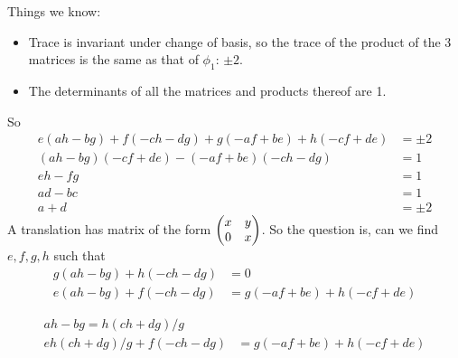 \documentclass[12pt]{article}
\begin{document}
\begin{description}
  Things we know:
  \begin{itemize}
  \item Trace is invariant under change of basis, so the trace of the product
    of the 3 matrices is the same as that of $\phi_1$: $\pm 2$.
  \item The determinants of all the matrices and products thereof are 1.
  \end{itemize}
  So
  \begin{align*}
    e(ah - bg) + f(-ch - dg) + g(-af + be) + h(-cf + de) &= \pm 2 \\
    (ah - bg)(-cf + de) - (-af + be)(-ch - dg) &= 1 \\
    eh - fg &= 1 \\
    ad - bc &= 1 \\
    a + d &= \pm 2
  \end{align*}
  A translation has matrix of the form $\begin{pmatrix}x & y\\0 & x\\ \end{pmatrix}$. So the question is,
  can we find $e,f,g,h$ such that
  \begin{align*}
    g(ah - bg) + h(-ch - dg) &= 0 \\
    e(ah - bg) + f(-ch - dg) &= g(-af + be) + h(-cf + de)
  \end{align*}

  \begin{align*}
    ah - bg = h(ch + dg)/g \\
    eh(ch + dg)/g + f(-ch - dg) &= g(-af + be) + h(-cf + de)
  \end{align*}


\end{description}
\end{document}
